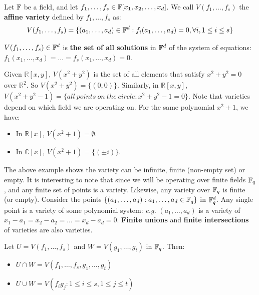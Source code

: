 \begin{Definition}
Let ${\mathbb{F}}$ be a field, and let $f_1, \ldots, f_s 
\in {\mathbb{F}}[x_1, x_2, \ldots, x_d]$. 
We call $V(f_1, \dots, f_s)$ the {\bf affine variety} 
defined by $f_1, \dots, f_s$ as:
\begin{equation}
V(f_1, \ldots, f_s)= \{(a_1, \ldots, a_{d})\in {\mathbb{F}}^d:f_i(a_1, \ldots, a_d)=0, \forall{i},1\le i \le s\}
\end{equation}
\end{Definition}

$V(f_1, \dots, f_s)\in {\mathbb{F}}^d$ is {\bf the set of all solutions} in ${\mathbb{F}}^d$ 
of the system of equations: 
$f_1(x_1,\ldots,x_d)=\dots=f_s(x_1,\dots,x_d)=0$. 

\begin{Example}
Given $\mathbb{R}\left[x,y\right]$, $V(x^2+y^2)$ is the set of all elements
that satisfy $x^2+y^2=0$ over $\mathbb{R}^2$. So $V(x^2+y^2)=\{(0,0)\}$. 
Similarly, in $\mathbb{R}\left[x,y\right]$, $V(x^2+y^2-1)=\{all\  points\  on\ the\ circle: x^2+y^2-1=0\}$.
Note that varieties depend on which field we are operating on. 
For the same polynomial $x^2+1$, we have:
\begin{itemize}
\item In $\mathbb{R}[x]$, $V(x^2+1)=\emptyset$.
\item In $\mathbb{C}[x]$, $V(x^2+1)=\{(\pm i)\}$.
\end{itemize}
\end{Example}

The above example shows the variety can be infinite, finite (non-empty set) 
or empty. It is interesting to note that since we will be operating over
finite fields ${\mathbb{F}}_{q}$, and any finite set of points is a variety. Likewise,
any variety over ${\mathbb{F}}_{q}$ is finite (or empty).
Consider the points $\{(a_1,\dots, a_d): a_1, \dots, a_d \in {\mathbb{F}}_q\}$
in ${\mathbb{F}}_q^d$. Any single point is a variety of some polynomial system:
{\it e.g.} $(a_1,\dots, a_d)$ is a variety of $x_1-a_1 = x_2 - a_2 = \dots =
x_d-a_d=0$. {\bf Finite unions} and {\bf finite  intersections} of
varieties are also varieties. 

\begin{Example}
Let $U = V(f_1, \dots, f_s)$ and $W =
V(g_1, \dots, g_t)$ in ${\mathbb{F}}_{q}$. Then:  
\begin{itemize}
\item $U \cap W = V(f_1, \dots, f_s, g_1, \dots, g_t)$
\item $U \cup W = V(f_i g_j: 1 \leq i \leq s, 1 \leq j \leq t)$
\end{itemize}
\end{Example}


